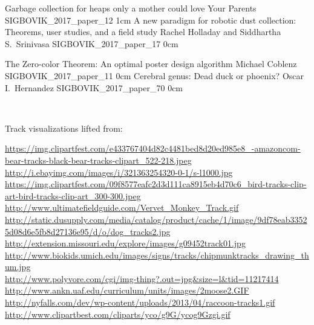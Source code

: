 \addpaper
	{Garbage collection for heaps only a mother could love}
	{Your Parents}
	{}
	{SIGBOVIK_2017_paper_12}
	{1cm}
	{}
\addpaper
	{A new paradigm for robotic dust collection: Theorems, user studies, and a field study}
	{Rachel Holladay and Siddhartha S.\ Srinivasa}
	{}
	{SIGBOVIK_2017_paper_17}
	{0cm}
	{}

\addpaper
	{The Zero-color Theorem: An optimal poster design algorithm}
	{Michael Coblenz}
	{}
	{SIGBOVIK_2017_paper_11}
	{0cm}
	{}
\addpaper
	{Cerebral genus: Dead duck or phoenix?}
	{Oscar I.\ Hernandez}
	{}
	{SIGBOVIK_2017_paper_70}
	{0cm}
	{}

\hfill \\
\vfill

\centerline{Track visualizations lifted from:}

{
\noindent
\tiny
\url{https://img.clipartfest.com/e433767404d82c4481bed8d20ed985e8_-amazoncom-bear-tracks-black-bear-tracks-clipart_522-218.jpeg} \\
\url{http://i.ebayimg.com/images/i/321363254320-0-1/s-l1000.jpg} \\
\url{https://img.clipartfest.com/09f8577eafc2d3d111ca8915eb4d70c6_bird-tracks-clip-art-bird-tracks-clip-art_300-300.jpeg} \\
\url{http://www.ultimatefieldguide.com/Vervet_Monkey_Track.gif} \\
\url{http://static.dusupply.com/media/catalog/product/cache/1/image/9df78eab33525d08d6e5fb8d27136e95/d/o/dog_tracks2.jpg} \\
\url{http://extension.missouri.edu/explore/images/g09452track01.jpg} \\
\url{http://www.biokids.umich.edu/images/signs/tracks/chipmunktracks_drawing_thum.jpg} \\
\url{http://www.polyvore.com/cgi/img-thing?.out=jpg&size=l&tid=11217414} \\
\url{http://www.ankn.uaf.edu/curriculum/units/images/2moose2.GIF} \\
\url{http://nyfalls.com/dev/wp-content/uploads/2013/04/raccoon-tracks1.gif} \\
\url{http://www.clipartbest.com/cliparts/yco/g9G/ycog9Gzgi.gif} \\
}
